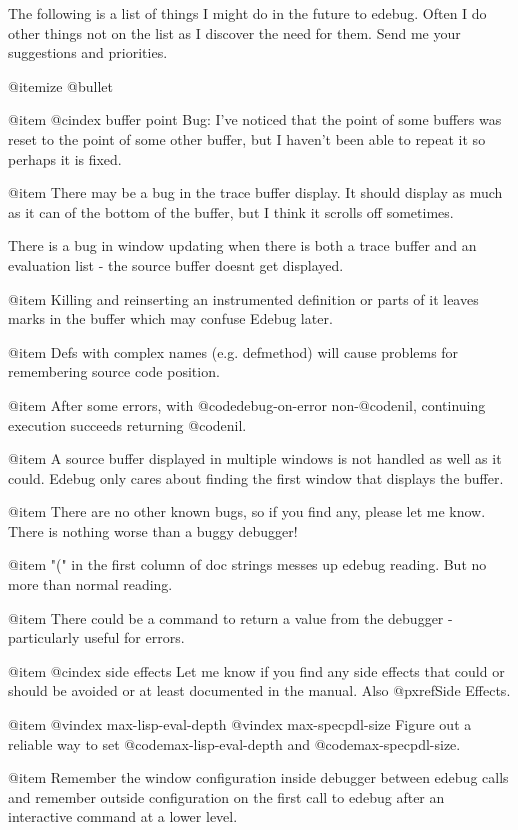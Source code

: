 The following is a list of things I might do in the future to edebug.
Often I do other things not on the list as I discover the need for them.
Send me your suggestions and priorities.

@itemize @bullet

@item
@cindex buffer point
Bug: I've noticed that the point of some buffers was reset to the point
of some other buffer, but I haven't been able to repeat it so perhaps
it is fixed.

@item
There may be a bug in the trace buffer display.  It should display as
much as it can of the bottom of the buffer, but I think it scrolls off
sometimes.

There is a bug in window updating when there is both a trace buffer
and an evaluation list - the source buffer doesnt get displayed.

@item 
Killing and reinserting an instrumented definition or parts of
it leaves marks in the buffer which may confuse Edebug later.

@item
Defs with complex names (e.g. defmethod) will cause problems
for remembering source code position.

@item
After some errors, with @code{debug-on-error} non-@code{nil}, continuing
execution succeeds returning @code{nil}.

@item
A source buffer displayed in multiple windows is not handled as well as
it could.  Edebug only cares about finding the first window that
displays the buffer.

@item
There are no other known bugs, so if you find any, please let me know.
There is nothing worse than a buggy debugger!

@item
"(" in the first column of doc strings messes up edebug reading.
But no more than normal reading.

@item
There could be a command to return a value from the debugger -
particularly useful for errors.

@item
@cindex side effects
Let me know if you find any side effects that could or should be avoided
or at least documented in the manual.
Also @pxref{Side Effects}.

@item
@vindex max-lisp-eval-depth
@vindex max-specpdl-size
Figure out a reliable way to set @code{max-lisp-eval-depth} and
@code{max-specpdl-size}.

@item
Remember the window configuration inside debugger between edebug calls
and remember outside configuration on the first call to edebug after an
interactive command at a lower level.

